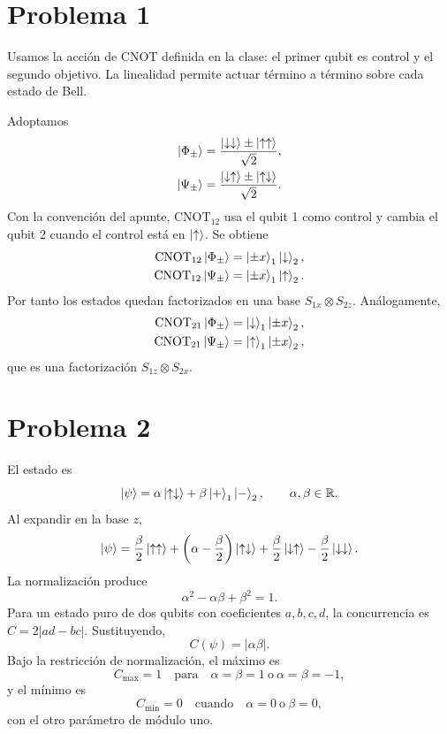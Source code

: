 \documentclass[11pt,a4paper]{article}
\numberwithin{equation}{section}
\renewcommand{\boxed}[1]{#1}
\newcommand{\R}{\mathbb R}
\begin{document}
\section{Problema 1}
Usamos la acción de CNOT definida en la clase: el primer qubit es control y el segundo objetivo. La linealidad permite actuar término a término sobre cada estado de Bell.

Adoptamos
\begin{align}
\ket{\Phi_\pm}&=\frac{\ket{\downarrow\downarrow}\pm\ket{\uparrow\uparrow}}{\sqrt2},\\
\ket{\Psi_\pm}&=\frac{\ket{\downarrow\uparrow}\pm\ket{\uparrow\downarrow}}{\sqrt2}.
\end{align}
Con la convención del apunte, $\mathrm{CNOT}_{12}$ usa el qubit 1 como control y cambia el qubit 2 cuando el control está en $\ket\uparrow$. Se obtiene
\begin{align}
\mathrm{CNOT}_{12}\ket{\Phi_\pm}&=\ket{\pm x}_1\ket\downarrow_2,\\
\mathrm{CNOT}_{12}\ket{\Psi_\pm}&=\ket{\pm x}_1\ket\uparrow_2.
\end{align}
Por tanto los estados quedan factorizados en una base $S_{1x}\otimes S_{2z}$. Análogamente,
\begin{align}
\mathrm{CNOT}_{21}\ket{\Phi_\pm}&=\ket\downarrow_1\ket{\pm x}_2,\\
\mathrm{CNOT}_{21}\ket{\Psi_\pm}&=\ket\uparrow_1\ket{\pm x}_2,
\end{align}
que es una factorización $S_{1z}\otimes S_{2x}$.

\section{Problema 2}
El estado es
\begin{equation}
\ket\psi=\alpha\ket{\uparrow\downarrow}+\beta\ket{+}_1\ket{-}_2,
\qquad \alpha,\beta\in\R.
\end{equation}
Al expandir en la base $z$,
\begin{equation}
\ket\psi=\frac\beta2\ket{\uparrow\uparrow}
+\left(\alpha-\frac\beta2\right)\ket{\uparrow\downarrow}
+\frac\beta2\ket{\downarrow\uparrow}-\frac\beta2\ket{\downarrow\downarrow}.
\end{equation}
La normalización produce
\begin{equation}
\boxed{\alpha^2-\alpha\beta+\beta^2=1.}
\end{equation}
Para un estado puro de dos qubits con coeficientes $a,b,c,d$, la concurrencia es $C=2|ad-bc|$. Sustituyendo,
\begin{equation}
\boxed{C(\psi)=|\alpha\beta|.}
\end{equation}
Bajo la restricción de normalización, el máximo es
\begin{equation}
\boxed{C_{\max}=1\quad\text{para}\quad \alpha=\beta=1\ \text{o}\ \alpha=\beta=-1,}
\end{equation}
y el mínimo es
\begin{equation}
\boxed{C_{\min}=0\quad\text{cuando}\quad \alpha=0\ \text{o}\ \beta=0,}
\end{equation}
con el otro parámetro de módulo uno.
\end{document}
